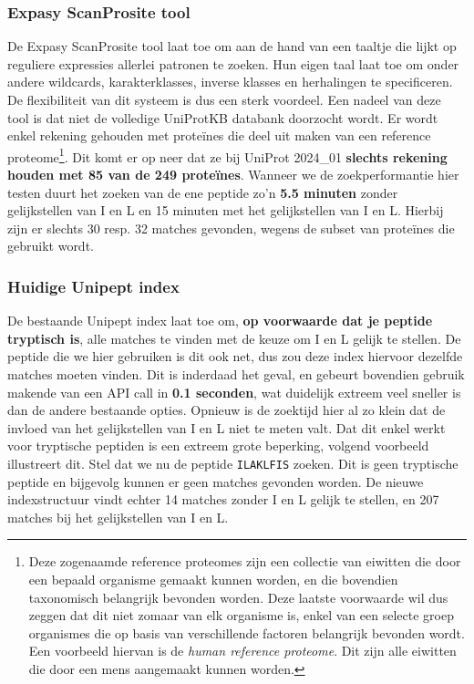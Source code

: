 \subsubsection{Expasy ScanProsite tool}
De Expasy ScanProsite tool\cite{scanprosite} laat toe om aan de hand van een taaltje die lijkt op reguliere expressies allerlei patronen te zoeken.
Hun eigen taal laat toe om onder andere wildcards, karakterklasses, inverse klasses en herhalingen te specificeren.
De flexibiliteit van dit systeem is dus een sterk voordeel.
Een nadeel van deze tool is dat niet de volledige UniProtKB databank doorzocht wordt.
Er wordt enkel rekening gehouden met proteïnes die deel uit maken van een reference proteome\footnote{Deze zogenaamde reference proteomes zijn een collectie van eiwitten die door een bepaald organisme gemaakt kunnen worden, en die bovendien taxonomisch belangrijk bevonden worden. Deze laatste voorwaarde wil dus zeggen dat dit niet zomaar van elk organisme is, enkel van een selecte groep organismes die op basis van verschillende factoren belangrijk bevonden wordt. Een voorbeeld hiervan is de \textit{human reference proteome}. Dit zijn alle eiwitten die door een mens aangemaakt kunnen worden.}.
Dit komt er op neer dat ze bij UniProt 2024\_01 \textbf{slechts rekening houden met 85 van de 249 proteïnes}.
Wanneer we de zoekperformantie hier testen duurt het zoeken van de ene peptide zo'n \textbf{5.5 minuten} zonder gelijkstellen van I en L en 15 minuten met het gelijkstellen van I en L\@.
Hierbij zijn er slechts 30 resp. 32 matches gevonden, wegens de subset van proteïnes die gebruikt wordt.

\subsubsection{Huidige Unipept index}
De bestaande Unipept index laat toe om, \textbf{op voorwaarde dat je peptide tryptisch is}, alle matches te vinden met de keuze om I en L gelijk te stellen.
De peptide die we hier gebruiken is dit ook net, dus zou deze index hiervoor dezelfde matches moeten vinden.
Dit is inderdaad het geval, en gebeurt bovendien gebruik makende van een API call in \textbf{0.1 seconden}, wat duidelijk extreem veel sneller is dan de andere bestaande opties.
Opnieuw is de zoektijd hier al zo klein dat de invloed van het gelijkstellen van I en L niet te meten valt.
Dat dit enkel werkt voor tryptische peptiden is een extreem grote beperking, volgend voorbeeld illustreert dit.
Stel dat we nu de peptide \texttt{ILAKLFIS} zoeken.
Dit is geen tryptische peptide en bijgevolg kunnen er geen matches gevonden worden.
De nieuwe indexstructuur vindt echter 14 matches zonder I en L gelijk te stellen, en 207 matches bij het gelijkstellen van I en L.

